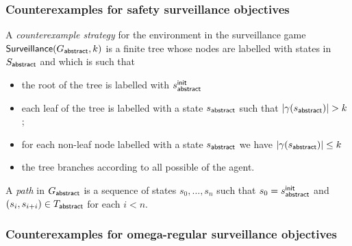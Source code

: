 \subsubsection{Counterexamples for safety surveillance objectives}
A \emph{counterexample strategy} for the environment in the surveillance game $\mathsf{Surveillance}(G_{\mathsf{abstract}},k)$ is a finite tree whose nodes are labelled with states in $S_{\mathsf{abstract}}$ and which is such that
\begin{itemize}
\item the root of the tree is labelled with $s_{\mathsf{abstract}}^{\mathsf{init}}$
\item each leaf of the tree is labelled with a state $s_{\mathsf{abstract}}$ such that  $|\gamma(s_{\mathsf{abstract}})|  > k$;
\item for each non-leaf node labelled with a state $s_{\mathsf{abstract}}$ we have $|\gamma(s_{\mathsf{abstract}})|  \leq k$
\item the tree branches according to all possible of the agent.
\end{itemize}

A \emph{path} in $G_{\mathsf{abstract}}$ is a sequence of states $s_0,\ldots,s_n$ such that $s_0 = s_{\mathsf{abstract}}^{\mathsf{init}}$ and $(s_i,s_{i+i}) \in T_{\mathsf{abstract}}$ for each $i < n$.

\begin{example}
\end{example}

\subsubsection{Counterexamples for omega-regular surveillance objectives}

\begin{example}
\end{example}